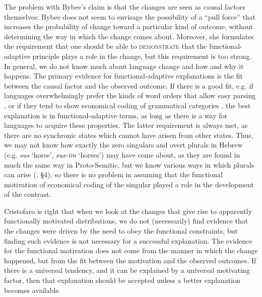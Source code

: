 \documentclass[output=paper]{langsci/langscibook}
\begin{document}
The problem with Bybee’s claim is that the changes are seen as causal factors themselves: Bybee does not seem to envisage the possibility of a “pull force” that increases the probability of change toward a particular kind of outcome, without determining the way in which the change comes about. Moreover, she formulates the requirement that one should be able to \textsc{demonstrate} that the functional-adaptive principle plays a role in the change, but this requirement is too strong. In general, we do not know much about language change and how and why it happens. The primary evidence for functional-adaptive explanations is the fit between the causal factor and the observed outcome. If there is a good fit, e.g. if languages overwhelmingly prefer the kinds of word orders that allow easy parsing \citep{Hawkins2014_VarEff}, or if they tend to show economical coding of grammatical categories \citep{Haspelmath2008_FreqIcon}, the best explanation is in functional-adaptive terms, as long as there is a way for languages to acquire these properties. The latter requirement is always met, as there are no synchronic states which cannot have arisen from other states. Thus, we may not know how exactly the zero singulars and overt plurals in Hebrew (e.g. \textit{sus} ‘horse’, \textit{sus-im} ‘horses’) may have come about, as they are found in much the same way in Proto-Semitic, but we know various ways in which plurals can arise (\citealt{Cristofaro2013}: §4), so there is no problem in assuming that the functional motivation of economical coding of the singular played a role in the development of the contrast.

Cristofaro is right that when we look at the changes that give rise to apparently functionally motivated distributions, we do not (necessarily) find evidence that the changes were driven by the need to obey the functional constraints, but finding such evidence is not necessary for a successful explanation. The evidence for the functional motivation does not come from the manner in which the change happened, but from the fit between the motivation and the observed outcomes. If there is a universal tendency, and it can be explained by a universal motivating factor, then that explanation should be accepted unless a better explanation becomes available.
\end{document}
